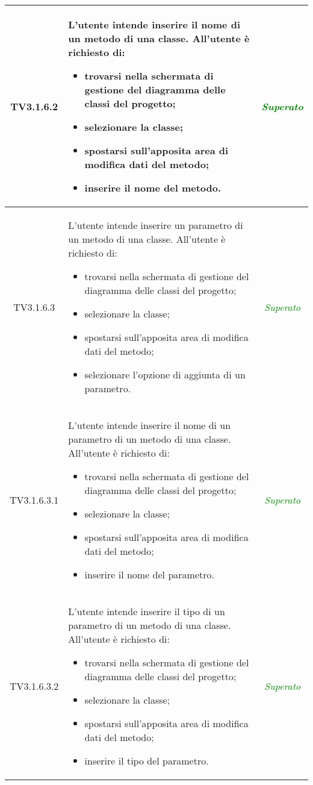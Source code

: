 \begin{longtable}{|c|>{}m{8cm}|c|}
\hypertarget{TV3.1.6.2}{TV3.1.6.2} & L'utente intende inserire il nome di un metodo di una classe.
All'utente è richiesto di:
\begin{itemize}
	\item trovarsi nella schermata di gestione del diagramma delle classi del progetto;
	\item selezionare la classe;
	\item spostarsi sull'apposita area di modifica dati del metodo;
	\item inserire il nome del metodo.
\end{itemize} & \textcolor{Green}{\textit{Superato}}\\ \hline

\hypertarget{TV3.1.6.3}{TV3.1.6.3} & L'utente intende inserire un parametro di un metodo di una classe.
All'utente è richiesto di:
\begin{itemize}
	\item trovarsi nella schermata di gestione del diagramma delle classi del progetto;
	\item selezionare la classe;
	\item spostarsi sull'apposita area di modifica dati del metodo;
	\item selezionare l'opzione di aggiunta di un parametro.
\end{itemize} & \textcolor{Green}{\textit{Superato}}\\ \hline

\hypertarget{TV3.1.6.3.1}{TV3.1.6.3.1} & L'utente intende inserire il nome di un parametro di un metodo di una classe.
All'utente è richiesto di:
\begin{itemize}
	\item trovarsi nella schermata di gestione del diagramma delle classi del progetto;
	\item selezionare la classe;
	\item spostarsi sull'apposita area di modifica dati del metodo;
	\item inserire il nome del parametro.
\end{itemize} & \textcolor{Green}{\textit{Superato}}\\ \hline

\hypertarget{TV3.1.6.3.2}{TV3.1.6.3.2} & L'utente intende inserire il tipo di un parametro di un metodo di una classe.
All'utente è richiesto di:
\begin{itemize}
	\item trovarsi nella schermata di gestione del diagramma delle classi del progetto;
	\item selezionare la classe;
	\item spostarsi sull'apposita area di modifica dati del metodo;
	\item inserire il tipo del parametro.
\end{itemize} & \textcolor{Green}{\textit{Superato}}\\ \hline


\end{longtable}
